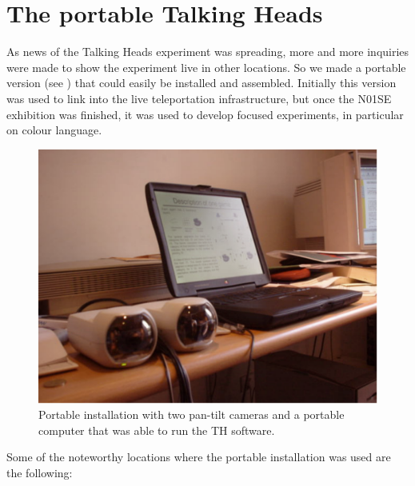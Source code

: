 \section{The portable Talking Heads} 

As news of the Talking Heads experiment was spreading, more and more inquiries were made to 
show the experiment live in other locations. So we made a portable version (see ) that could easily 
be installed and assembled. Initially this version was used to link into the live 
teleportation infrastructure, but once the N01SE exhibition was finished, it was used to develop focused 
experiments, in particular on colour language. 

\begin{figure}[htbp]
  \centerline{\includegraphics[width=.60\textwidth]{chap9/figs/road.pdf}}
\caption{\label{fig:road}Portable installation with two pan-tilt cameras and a portable computer that was able to run the TH software.}
\end{figure}

Some of the noteworthy locations where the portable installation was used are the following: 

